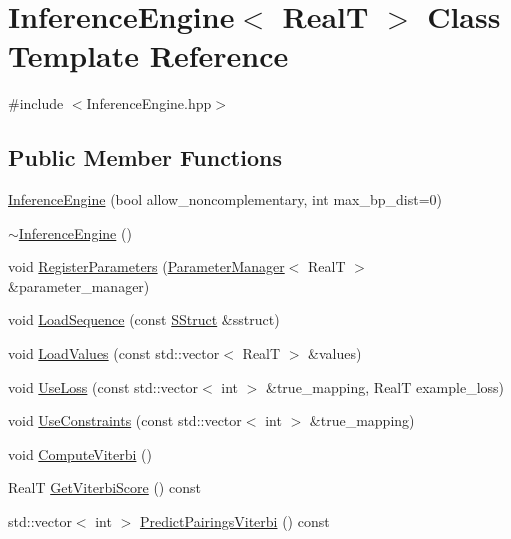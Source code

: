 \hypertarget{class_inference_engine}{\section{Inference\+Engine$<$ Real\+T $>$ Class Template Reference}
\label{class_inference_engine}
}


{\ttfamily \#include $<$Inference\+Engine.\+hpp$>$}

\subsection*{Public Member Functions}
\begin{DoxyCompactItemize}
\item 
\hyperlink{class_inference_engine_ad8ecaebd1482737444c6ff701fde74de}{Inference\+Engine} (bool allow\+\_\+noncomplementary, int max\+\_\+bp\+\_\+dist=0)
\item 
\hyperlink{class_inference_engine_ab79efe41385aeef2e1703dc9335a4941}{$\sim$\+Inference\+Engine} ()
\item 
void \hyperlink{class_inference_engine_a5f4b92138aaa9a45fcc045f818286bd8}{Register\+Parameters} (\hyperlink{class_parameter_manager}{Parameter\+Manager}$<$ Real\+T $>$ \&parameter\+\_\+manager)
\item 
void \hyperlink{class_inference_engine_a092dc8818603fbc358e2226f3e743d62}{Load\+Sequence} (const \hyperlink{class_s_struct}{S\+Struct} \&sstruct)
\item 
void \hyperlink{class_inference_engine_abd2764fab807200098b69141b0d1eaca}{Load\+Values} (const std\+::vector$<$ Real\+T $>$ \&values)
\item 
void \hyperlink{class_inference_engine_a1c4ff1f7f65a76fa1111ef554ae17ed2}{Use\+Loss} (const std\+::vector$<$ int $>$ \&true\+\_\+mapping, Real\+T example\+\_\+loss)
\item 
void \hyperlink{class_inference_engine_a6a1c5eeb8bfb91e8562d9e937c7c46aa}{Use\+Constraints} (const std\+::vector$<$ int $>$ \&true\+\_\+mapping)
\item 
void \hyperlink{class_inference_engine_ad31521433bc7ca8747f42313571dca0d}{Compute\+Viterbi} ()
\item 
Real\+T \hyperlink{class_inference_engine_a12a4e655e8f06f81a06564f8f81499dc}{Get\+Viterbi\+Score} () const 
\item 
std\+::vector$<$ int $>$ \hyperlink{class_inference_engine_a09ba49b0dc0d9161d48a13f9948cbeea}{Predict\+Pairings\+Viterbi} () const 

\end{DoxyCompactItemize}
